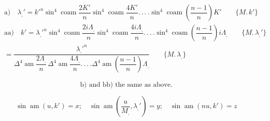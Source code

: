 \documentclass{article}
\begin{document}
\[
\begin{gathered}
\text{a)}\quad \lambda_{,}'=k'^{n}\sin^{4}\operatorname{coam}\dfrac{2K'}{n}\sin^{4}\operatorname{coam}\dfrac{4K'}{n}.\,.\,.\,.\sin^{4}\operatorname{coam}\left(\dfrac{n-1}{n}\right)K'\qquad\{M.\,k'\}\\[1.5ex]
\text{aa)}\quad k'={\lambda_{,}'}^{n}\sin^{4}\operatorname{coam}\dfrac{2i\Lambda_{,}}{n}\sin^{4}\operatorname{coam}\dfrac{4i\Lambda_{,}}{n}.\,.\,.\,.\sin^{4}\operatorname{coam}\left(\dfrac{n-1}{n}\right)i\Lambda_{,}\qquad\{M.\,\lambda_{,}'\}\\[1.5ex]
{}=\dfrac{{\lambda_{,}'}^{n}}{\Delta^{4}\operatorname{am}\dfrac{2\Lambda_{,}}{n}\,\Delta^{4}\operatorname{am}\dfrac{4\Lambda_{,}}{n}.\,.\,.\,.\Delta^{4}\operatorname{am}\left(\dfrac{n-1}{n}\right)\Lambda_{,}}\qquad\{M.\,\lambda_{,}\}
\end{gathered}
\]

\[\text{b) and bb) the same as above.}\]

\[
\sin\operatorname{am}(u,k')=x;\quad \sin\operatorname{am}\left(\dfrac{u}{M_{,}},\lambda_{,}'\right)=y;\quad \sin\operatorname{am}(nu,k')=z
\]
\end{document}
